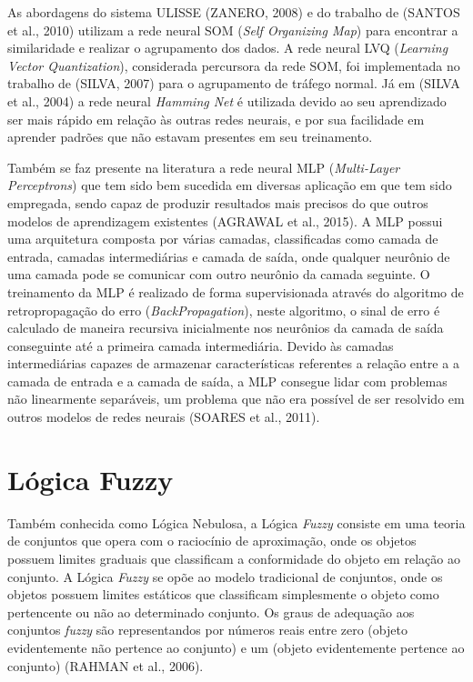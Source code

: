 \indent As abordagens do sistema ULISSE (ZANERO, 2008) e do trabalho de (SANTOS et al., 2010) utilizam a rede neural SOM (\textit{Self Organizing Map}) para encontrar a similaridade e realizar o agrupamento dos dados. A rede neural LVQ (\textit{Learning Vector Quantization}), considerada percursora da rede SOM, foi implementada no trabalho de (SILVA, 2007) para o agrupamento de tráfego normal. Já em (SILVA et al., 2004) a rede neural \textit{Hamming Net} é utilizada devido ao seu aprendizado ser mais rápido em relação às outras redes neurais, e por sua facilidade em aprender padrões que não estavam presentes em seu treinamento.

Também se faz presente na literatura a rede neural MLP (\textit{Multi-Layer Perceptrons}) que tem sido bem sucedida em diversas aplicação em que tem sido empregada, sendo capaz de produzir resultados mais precisos do que outros modelos de aprendizagem existentes (AGRAWAL et al., 2015). A MLP possui uma arquitetura composta por várias camadas, classificadas como camada de entrada, camadas intermediárias e camada de saída, onde qualquer neurônio de uma camada pode se comunicar com outro neurônio da camada seguinte. O treinamento da MLP é realizado de forma supervisionada através do algoritmo  de retropropagação do erro (\textit{BackPropagation}), neste algoritmo, o sinal de erro é calculado de maneira recursiva inicialmente nos neurônios da camada de saída conseguinte  até a primeira camada intermediária. Devido às camadas intermediárias capazes de armazenar características referentes a relação entre a a camada de entrada e a camada de saída, a MLP consegue lidar com problemas não linearmente separáveis, um problema que não era possível de ser resolvido em outros modelos de redes neurais (SOARES et al., 2011).

  \section{Lógica Fuzzy}
\indent Também conhecida como Lógica Nebulosa, a Lógica \textit{Fuzzy} consiste em uma teoria de conjuntos que opera com o raciocínio de aproximação, onde os objetos possuem limites graduais que classificam a conformidade do objeto em relação ao conjunto. A Lógica \textit{Fuzzy} se opõe ao modelo tradicional de conjuntos, onde os objetos possuem limites estáticos que classificam simplesmente o objeto como pertencente ou não ao determinado conjunto. Os graus de adequação aos conjuntos \textit{fuzzy} são representandos por números reais entre zero (objeto evidentemente não pertence ao conjunto) e um (objeto evidentemente pertence ao conjunto) (RAHMAN et al., 2006).

